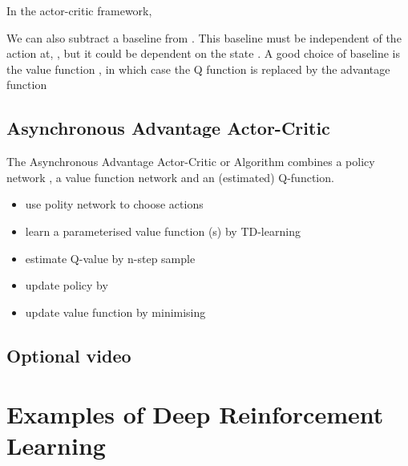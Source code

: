 \documentclass[11pt]{article}
\begin{document}
In the actor-critic framework,

We can also subtract a baseline from .
This baseline must be independent of the action at, , but it could be dependent on the state .
A good choice of baseline is the value function , in which case the Q function is replaced by the advantage function

\subsection{Asynchronous Advantage Actor-Critic}\label{subsec:asynchronous-advantage-actor-critic}

The Asynchronous Advantage Actor-Critic or  Algorithm combines a policy network , a value function network and an (estimated) Q-function.
\begin{itemize}
    \item use polity network  to choose actions
    \item learn a parameterised value function (s) by TD-learning
    \item estimate Q-value by n-step sample
    \item update policy  by
    \item update value function  by minimising
\end{itemize}

\subsection{Optional video}\label{subsec:optional-video9}

\section{Examples of Deep Reinforcement Learning}\label{sec:examples-of-deep-reinforcement-learning}
\end{document}
